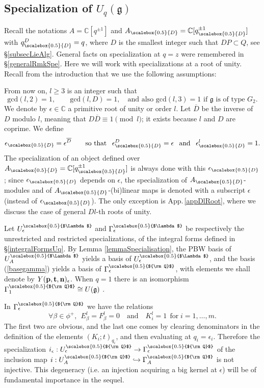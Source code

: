 \documentclass[11pt]{amsart}
\newcommand{\e}{\epsilon}
\newcommand{\qD}{q_{\scalebox{0.5}{D}}}
\newcommand{\eD}{\epsilon_{\scalebox{0.5}{D}}}
\newcommand{\AD}{A_{\scalebox{0.5}{D}}}
\newcommand{\Q}{{\scalebox{0.5}{${\rm Q}$}}}
\newcommand{\Lam}{{\scalebox{0.5}{$\Lambda$}}}
\begin{document}
\subsection{Specialization of \texorpdfstring{$U_q(\mathfrak{g})$}{the quantum enveloping algebra}}\label{specializUq} Recall the notations $A = \mathbb{C}[q^{\pm 1}]$ and $\AD = \mathbb{C}[\qD^{\pm 1}]$ with $\qD^D = q$, where $D$ is the smallest integer such that $DP \subset Q$, see \S\ref{subsecLieAlg}. General facts on specialization at $q=z$ were remembered in \S\ref{generalRmkSpe}. Here we will work with specializations at a root of unity. Recall from the introduction that we use the following assumptions:
\medskip

\noindent {} From now on, $l \geq 3$ is an integer such that
\begin{equation}\label{assumptionl}
\mathrm{gcd}(l,2) = 1, \qquad \mathrm{gcd}(l,D) = 1, \quad \text{and also } \mathrm{gcd}(l,3) = 1 \text{ if } \mathfrak{g} \text{ is of type } G_2.
\end{equation}
We denote by $\epsilon \in \mathbb{C}$ a primitive root of unity or order $l$. Let $\overline{D}$ be the inverse of $D$ modulo $l$, meaning that $D\overline{D} \equiv 1 \pmod{l}$; it exists because $l$ and $D$ are coprime. We define
\begin{equation}\label{choixED}
\eD = \epsilon^{\overline{D}} \qquad \text{so that } \:\: \eD^D = \e \:\: \text{ and } \:\: \eD^l = 1.
\end{equation}
The specialization of an object defined over $\AD = \mathbb{C}[\qD^{\pm 1}]$ is always done with this $\eD$; since $\eD$ depends on $\e$, the specialization of $\AD$-modules and of $\AD$-(bi)linear maps is denoted with a subscript $\e$ (instead of $\eD$). The only exception is  App.\,\ref{appDlRoot}, where we discuss the case of general $Dl$-th roots of unity.

\medskip

Let $U_\e^\Lam$ and $\Gamma_\e^\Lam$ be respectively the unrestricted and restricted specializations, of the integral forms defined in \S\ref{integralFormsUq}. By Lemma \ref{lemmaSpecialisation}, the PBW basis of $U_A^\Lam$ yields a basis of $U_\e^\Lam$,  and the basis (\ref{basegamma}) yields a basis of $\Gamma_\e^\Q$, with elements we shall denote by $Y({\bf p}, {\bf t}, {\bf n})_\e$. When $q=1$ there is an isomorphism $\Gamma_1^\Q\cong U(\mathfrak{g})$ \cite[\S 6]{DC-L}.

In $\Gamma_\epsilon^\Q$ we have the relations
\begin{equation}\label{toto}\forall \beta\in \phi^+, \:\: E_{\beta}^l=F_{\beta}^l=0 \quad \text{and} \quad K_i^{l}=1 \:\:\text{for}\; i=1,\ldots,m.
\end{equation}
The first two are obvious, and the last one comes by clearing denominators in the definition of the elements $(K_i;t)_{q_i}$, and then evaluating at $q_i=\e_i$. Therefore the specialization $i_\e:U_\e^\Q\rightarrow \Gamma_{\e}^\Q$ of the inclusion map $i:U_A^\Q\hookrightarrow \Gamma_{A}^\Q$ is not injective. This degeneracy (i.e. an injection acquiring a big kernel at $\e$) will be of fundamental importance in the sequel.
\end{document}
